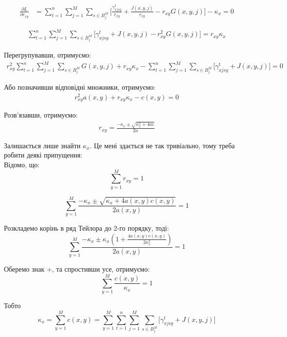 \documentclass[14pt]{article}
\begin{document}
\begin{align*}
\frac{\partial L}{\partial r_{xy}} &= \sum_{t=1}^{n} \sum_{j=1}^{M} \sum_{s \in B^M_j} \Big[\frac{\gamma_{xjsy}^t }{r_{xy}} + 
\frac{J(x, y, j)}{r_{xy}}- r_{xy} G(x, y, j)  \Big] - \kappa_x = 0
\end{align*}


\begin{align*}
\sum_{t=1}^{n} \sum_{j=1}^{M} \sum_{s \in B^M_j} \Big[\gamma_{xjsy}^t + 
J(x, y, j)- r_{xy}^{2} G(x, y, j) \Big] = r_{xy} \kappa_x
\end{align*}

Перегрупувавши, отримуємо:
\begin{align*}
r_{xy}^{2} \sum_{t=1}^{n} \sum_{j=1}^{M} \sum_{s \in B^M_j} G(x, y, j) + r_{xy} \kappa_x - \sum_{t=1}^{n} \sum_{j=1}^{M} \sum_{s \in B^M_j} \Big[ \gamma_{xjsy}^t + J(x, y, j) \Big] = 0
\end{align*}

Або позначивши відповідні множники, отримуємо:
\begin{align*}
r_{xy}^{2} a(x, y) + r_{xy} \kappa_x - c(x, y) = 0
\end{align*}

Розв'язавши, отримуємо:
\begin{align*}
r_{xy} = \frac{- \kappa_x \pm \sqrt{\kappa_x^2 + 4ac}}{2a}
\end{align*}

Залишається лише знайти $\kappa_x$. Це мені здається не так тривіально, тому треба робити деякі припущення:\\

Відомо, що:
$$\sum_{y=1}^{M} r_{xy} = 1$$

\pagebreak

$$\sum_{y=1}^{M} \frac{- \kappa_x \pm \sqrt{\kappa_x + 4a(x, y)c(x, y)}}{2a(x, y)} = 1$$

Розкладемо корінь в ряд Тейлора до 2-го порядку, тоді: \\
$$\sum_{y=1}^{M} \frac{- \kappa_x \pm \kappa_x (1 + \frac{4a(x,y) c(x, y)}{2 \kappa_x^2})}{2a(x, y)} = 1$$

Оберемо знак +, та спростивши усе, отримуємо:
$$\sum_{y=1}^{M} \frac{c(x, y)}{\kappa_x} = 1$$

Тобто 
$$\kappa_x = \sum_{y=1}^{M} c(x, y) = \sum_{y=1}^{M} \sum_{t=1}^{n} \sum_{j=1}^{M} \sum_{s \in B^M_j} \Big[ \gamma_{xjsy}^t + J(x, y, j)\Big]$$
\end{document}
